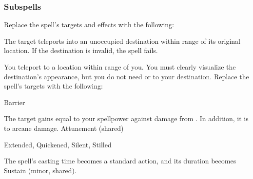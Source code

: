 \subsubsection{Subspells}
Replace the spell's targets and effects with the following:
\begin{spellcontent}
\begin{augmenttargetinginfo}
\end{augmenttargetinginfo}
\begin{augmenteffects}
\spelleffect
The target teleports into an unoccupied destination within \rngmed range of its original location.
If the destination is invalid, the spell fails.
\end{augmenteffects}
\end{spellcontent}
You teleport to a location within \rngext range of you.
You must clearly visualize the destination's appearance, but you do not need  or  to your destination.
Replace the spell's targets with the following:
\begin{spellcontent}
\begin{augmenttargetinginfo}
\end{augmenttargetinginfo}
\end{spellcontent}
\begin{spellsection}{Barrier}
\begin{spellheader}
\end{spellheader}
\begin{spellcontent}
\begin{spelltargetinginfo}
\end{spelltargetinginfo}
\begin{spelleffects}
\spelleffect
The target gains  equal to your spellpower against damage from .
In addition, it is  to arcane damage.
\spelldur Attunement (shared)
\end{spelleffects}
\end{spellcontent}
\begin{spellfooter}
 Extended, Quickened, Silent, Stilled
\end{spellfooter}
\begin{spellsubcontent}
\begin{spellcantrip}
The spell's casting time becomes a standard action, and its duration becomes Sustain (minor, shared).
\end{spellcantrip}
\end{spellsubcontent}
\end{spellsection}
